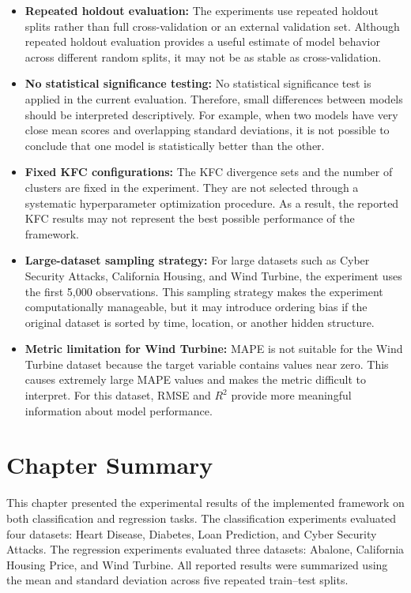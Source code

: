 \begin{itemize}
\item \textbf{Repeated holdout evaluation:} The experiments use repeated holdout splits rather than full cross-validation or an external validation set. Although repeated holdout evaluation provides a useful estimate of model behavior across different random splits, it may not be as stable as cross-validation.

\item \textbf{No statistical significance testing:} No statistical significance test is applied in the current evaluation. Therefore, small differences between models should be interpreted descriptively. For example, when two models have very close mean scores and overlapping standard deviations, it is not possible to conclude that one model is statistically better than the other.

\item \textbf{Fixed KFC configurations:} The KFC divergence sets and the number of clusters are fixed in the experiment. They are not selected through a systematic hyperparameter optimization procedure. As a result, the reported KFC results may not represent the best possible performance of the framework.

\item \textbf{Large-dataset sampling strategy:} For large datasets such as Cyber Security Attacks, California Housing, and Wind Turbine, the experiment uses the first 5,000 observations. This sampling strategy makes the experiment computationally manageable, but it may introduce ordering bias if the original dataset is sorted by time, location, or another hidden structure.

\item \textbf{Metric limitation for Wind Turbine:} MAPE is not suitable for the Wind Turbine dataset because the target variable contains values near zero. This causes extremely large MAPE values and makes the metric difficult to interpret. For this dataset, RMSE and $R^2$ provide more meaningful information about model performance.
\end{itemize}


\section{Chapter Summary}
\label{sec:chapter_summary_results}

\hs This chapter presented the experimental results of the implemented framework on both classification and regression tasks. The classification experiments evaluated four datasets: Heart Disease, Diabetes, Loan Prediction, and Cyber Security Attacks. The regression experiments evaluated three datasets: Abalone, California Housing Price, and Wind Turbine. All reported results were summarized using the mean and standard deviation across five repeated train--test splits.

